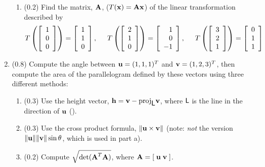 \documentclass[11pt,titlepage,fleqn]{article}
\begin{document}
\begin{enumerate}
\begin{enumerate}
\item (0.2) Find the matrix, $\mbox{${\bf A}$}$, ($T(\mbox{${\bf x}$}) = \mbox{${\bf A}$}\mbox{${\bf x}$}$) of the linear transformation described by
%
\begin{equation*}
T \left( \left[ \begin{array}{r} 1 \\ 0 \\ 0  \end{array} \right] \right) = \left[ \begin{array}{r} 1 \\ 1 \\ 0 \end{array} \right],
\hspace{0.5cm}
T \left( \left[ \begin{array}{r} 2 \\ 1 \\ 0  \end{array} \right] \right) = \left[ \begin{array}{r} 1 \\ 0 \\ -1 \end{array} \right],
\hspace{0.5cm}
T \left( \left[ \begin{array}{r} 3 \\ 2 \\ 1  \end{array} \right] \right) = \left[ \begin{array}{r} 0 \\ 1 \\ 1 \end{array} \right]
\end{equation*}

\end{enumerate}


\pagebreak
\item (0.8) Compute the angle between $\mbox{${\bf u}$} = (1,1,1)^T$ and $\mbox{${\bf v}$} = (1,2,3)^T$, then compute the area of the parallelogram defined by these vectors using three different methods:
%
\begin{enumerate}
\item (0.3) Use the height vector, $\mbox{${\bf h}$} = \mbox{${\bf v}$} - \mathrm{proj}_{\mbox{${\sf L}$}} \mbox{${\bf v}$}$, where $\mbox{${\sf L}$}$ is the line in the direction of $\mbox{${\bf u}$}$ ().
\item (0.3) Use the cross product formula, $\| \mbox{${\bf u}$} \times \mbox{${\bf v}$} \|$ (note: {\em not} the version $\|\mbox{${\bf u}$}\|\|\mbox{${\bf v}$}\|\sin\theta$, which is used in part a).
\item (0.2) Compute $\sqrt{\det(\mbox{${\bf A}$}^T \mbox{${\bf A}$})}$, where $\mbox{${\bf A}$} = [\;\mbox{${\bf u}$} \; \mbox{${\bf v}$}\;]$.
\end{enumerate}


\end{enumerate}
\end{document}
